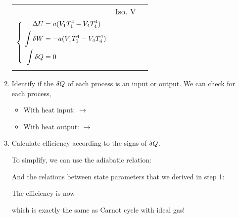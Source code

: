 \documentclass[class=article, crop=false, 12pt]{standalone}
\begin{document}
\begin{example}
\begin{enumerate}
\begin{center}
\begin{tabular}{>{\centering\arraybackslash}m{2cm} 
            >{\centering\arraybackslash}m{2.5cm} 
            c}
            & Iso. V
            & \makecell[l]{
                \phantom{\scriptsize abc}\\
                $\left\{ \ \begin{aligned} 
                    \Delta U &= a(V_1T_1^4-V_4T_4^4)\\
                    \int \var{W} &= -a(V_1T_1^4-V_4T_4^4)\\
                    \int \var{Q} &= 0\\
                 \end{aligned}\right.$\\
                \phantom{\scriptsize abc}
            }
        \end{tabular}
    \end{center}

    \item Identify if the $\var{Q}$ of each process is an input or output.
    We can check for each process,
    \begin{itemize}
        \item With heat input:  $\rightarrow$ 
        \item With heat output:  $\rightarrow$ 
    \end{itemize}


    \item Calculate efficiency according to the signs of $\var{Q}$.

    To simplify, we can use the adiabatic relation:

    And the relations between state parameters that we derived in step 1:

    The efficiency is now

    which is exactly the same as Carnot cycle with ideal gas!

    \end{enumerate}

\end{example}




\theend
\end{document}
